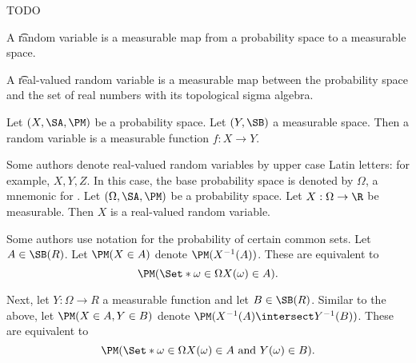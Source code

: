 

TODO



A \t{random variable} is a measurable map from a probability space to a measurable space.

A \t{real-valued random variable} is a measurable map between the probability space and the set of real numbers with its topological sigma algebra.



Let $(X, \SA, \PM)$ be a probability space.
Let $(Y, \SB)$ a measurable space.
Then a random variable is a measurable function $f: X \to Y$.

Some authors denote real-valued random variables by upper case Latin letters:
for example, $X, Y, Z$.  In this case, the base probability space is denoted by $\Omega$, a mnemonic for .
Let $(\Omega,\SA,\PM)$ be a probability space.
Let $X: \Omega \to \R$ be measurable.
Then $X$ is a real-valued random variable.

Some authors use notation for the probability of certain common sets.
Let $A \in \SB(R)$.
Let $\PM(X \in A)$ denote $\PM(X^{-1}(A))$.
These are equivalent to
\[
  \PM(\Set*{\omega \in \Omega}{X(\omega) \in A}).
\]

Next, let $Y: \Omega \to R$
a measurable function and
let $B \in \SB(R)$.
Similar to the above,
let $\PM(X \in A,Y \in B)$
denote $\PM(X^{-1}(A) \intersect Y^{-1}(B))$.
These are equivalent to
\[
  \PM(\Set*{\omega \in \Omega}{X(\omega) \in A \text{ and } Y(\omega) \in B}).
\]
